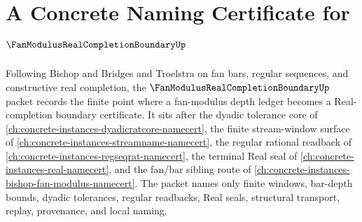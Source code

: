 \chapter{A Concrete Naming Certificate for $\FanModulusRealCompletionBoundaryUp$}
\label{ch:concrete-instances-fan-modulus-real-completion-boundary-namecert}

Following Bishop and Bridges and Troelstra on fan bars, regular sequences, and constructive real completion, the $\FanModulusRealCompletionBoundaryUp$ packet records the finite point where a fan-modulus depth ledger becomes a Real-completion boundary certificate. It sits after the dyadic tolerance core of \autoref{ch:concrete-instances-dyadicratcore-namecert}, the finite stream-window surface of \autoref{ch:concrete-instances-streamname-namecert}, the regular rational readback of \autoref{ch:concrete-instances-regseqrat-namecert}, the terminal Real seal of \autoref{ch:concrete-instances-real-namecert}, and the fan/bar sibling route of \autoref{ch:concrete-instances-bishop-fan-modulus-namecert}. The packet names only finite windows, bar-depth bounds, dyadic tolerances, regular readbacks, Real seals, structural transport, replay, provenance, and local naming.

